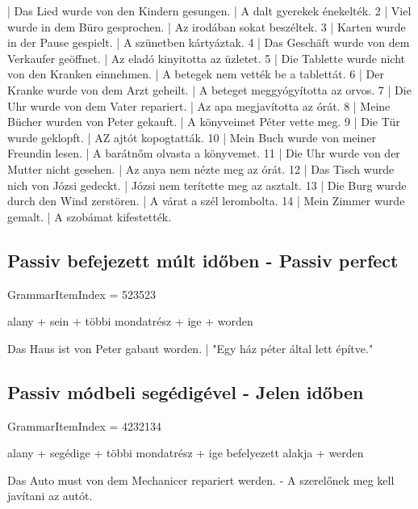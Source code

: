 \documentclass{article}
\newenvironment{desc}{\verbatim}{\endverbatim}
\newenvironment{exmp}{\verbatim}{\endverbatim}
\begin{document}
\begin{exmp}
1 | Das Lied wurde von den Kindern gesungen. | A dalt gyerekek énekelték.
2 | Viel wurde in dem Büro gesprochen. | Az irodában sokat beszéltek.
3 | Karten wurde in der Pause gespielt. | A szünetben kártyáztak.
4 | Das Geschäft wurde von dem Verkaufer geöffnet. | Az eladó kinyitotta az üzletet.
5 | Die Tablette wurde nicht von den Kranken einnehmen. | A betegek nem vették be a tablettát.
6 | Der Kranke wurde von dem Arzt geheilt. | A beteget meggyógyította az orvos.
7 | Die Uhr wurde von dem Vater repariert. | Az apa megjavította az órát.
8 | Meine Bücher wurden von Peter gekauft. | A könyveimet Péter vette meg.
9 | Die Tür wurde geklopft. | AZ ajtót kopogtatták.
10 | Mein Buch wurde von meiner Freundin lesen. | A barátnőm olvasta a könyvemet.
11 | Die Uhr wurde von der Mutter nicht gesehen. | Az anya nem nézte meg az órát.
12 | Das Tisch wurde nich von Józsi gedeckt. | Józsi nem terítette meg az asztalt.
13 | Die Burg wurde durch den Wind zerstören. | A várat a szél lerombolta.
14 | Mein Zimmer wurde gemalt. | A szobámat kifestették.
\end{exmp}

\subsection{Passiv befejezett múlt időben - Passiv perfect}

GrammarItemIndex = 523523

\begin{desc}
alany + sein + többi mondatrész + ige + worden

Das Haus ist von Peter gabaut worden. | "Egy ház péter által lett építve."
\end{desc}

\subsection{Passiv módbeli segédigével - Jelen időben}

GrammarItemIndex = 4232134

\begin{desc}
alany + segédige + többi mondatrész + ige befelyezett alakja + werden

Das Auto must von dem Mechanicer repariert werden. - A szerelőnek meg kell javítani az autót.
\end{desc}
\end{document}
